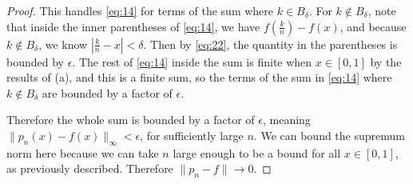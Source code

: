 \documentclass[12pt]{amsart}
\newcommand{\<}{\langle}
\renewcommand{\>}{\rangle}
\renewcommand{\-}[1]{\overline{#1}}
\begin{document}
\begin{itemize}
\begin{proof}
        This handles \eqref{eq:14} for terms of the sum where $k \in B_\delta$. For $k \notin B_\delta$, note that inside the inner parentheses of \eqref{eq:14}, we have $f(\frac{k}{n}) - f(x)$, and because $k \notin B_\delta$, we know $|\frac{k}{n} - x | < \delta$. Then by \eqref{eq:22}, the quantity in the parentheses is bounded by $\epsilon$. The rest of \eqref{eq:14} inside the sum is finite when $x \in [0,1]$ by the results of (a), and this is a finite sum, so the terms of the sum in \eqref{eq:14} where $k \notin B_\delta$ are bounded by a factor of $\epsilon$.

        Therefore the whole sum is bounded by a factor of $\epsilon$, meaning $\|p_n(x) - f(x)\|_\infty < \epsilon$, for sufficiently large $n$. We can bound the supremum norm here because we can take $n$ large enough to be a bound for all $x \in [0,1]$, as previously described. Therefore $\|p_n - f\| \to 0$.
    \end{proof}
\end{itemize}
\end{document}
